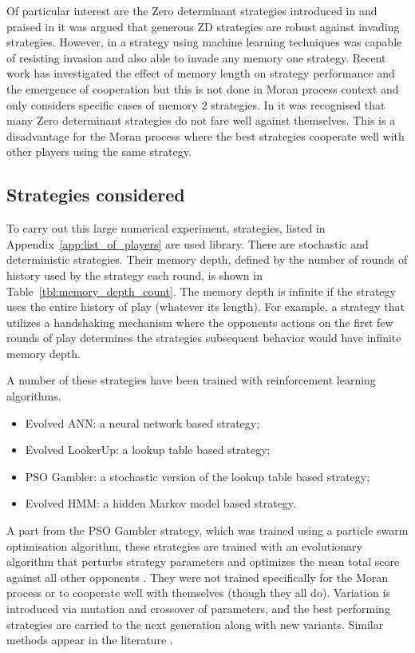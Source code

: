\documentclass{article}
\begin{document}
Of particular interest are the Zero determinant strategies introduced in
\cite{Press2012} and praised in \cite{Stewart2012} it was argued that generous
ZD strategies are robust against invading strategies. However, in \cite{Lee2015}
a strategy using machine learning techniques was capable of resisting invasion
and also able to invade any memory one strategy. Recent work \cite{Hilbe2017}
has investigated the effect of memory length on strategy performance and the
emergence of cooperation but this is not done in Moran process context and only
considers specific cases of memory 2 strategies. In \cite{Adami2013} it was
recognised that many Zero determinant strategies do not fare well against
themselves. This is a disadvantage for the Moran process where the best
strategies cooperate well with other players using the same strategy.

\subsection{Strategies considered}\label{sec:strategies}

To carry out this large numerical experiment, 
strategies, listed in Appendix~\ref{app:list_of_players} are used library. There
are stochastic and
deterministic strategies. Their memory depth,
defined by the number of rounds of history used by the strategy each round, is
shown in Table~\ref{tbl:memory_depth_count}. The memory depth is infinite if the
strategy uses the entire history of play (whatever its length). For example, a
strategy that utilizes a handshaking mechanism where the opponents actions on
the first few rounds of play determines the strategies subsequent behavior would
have infinite memory depth.

A number of these strategies have been trained with reinforcement learning
algorithms.

\begin{itemize}
    \item Evolved ANN: a neural network based strategy;
    \item Evolved LookerUp: a lookup table based strategy;
    \item PSO Gambler: a stochastic version of the lookup table based strategy;
    \item Evolved HMM: a hidden Markov model based strategy.
\end{itemize}

A part from the PSO Gambler strategy, which was trained using a particle swarm
optimisation algorithm, these strategies are trained with an evolutionary
algorithm that perturbs strategy parameters and optimizes the mean total score
against all other opponents \cite{affenzeller2009genetic}. They were not
trained specifically for the Moran process or to cooperate well with themselves
(though they all do). Variation is
introduced via mutation and crossover of parameters, and the best performing
strategies are carried to the next generation along with new variants. Similar
methods appear in the literature \cite{Ashlock2006}.
\end{document}
